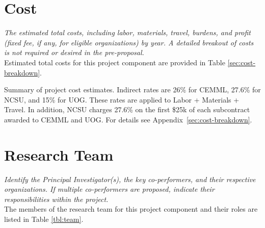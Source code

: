 \documentclass[11pt,english,letterpaper]{scrartcl}
\begin{document}
\begin{comment}
Month 2: Use annotations to train an object detector for CRB damage using the Faster R-CNN model implemented in the TensorFlow object detection API. This work requires setting up a virtual machine with graphics processing unit (GPU).

Month 3: Evaluate results from the trained object detector. If precision is insufficient, collect more annotated videos and add these to the training set.

Month 4: Develop a software system which will take raw video GPS tracks as input, outputting CRB damage maps and statistics.

Month 12: Prepare final report.

\end{comment}

\section{Cost}

\textit{The estimated total costs, including labor, materials, travel, burdens, and profit	(fixed fee, if any, for eligible organizations) by year. A detailed breakout of costs is not	required or desired in the pre-proposal.}\\

Estimated total costs for this project component are provided in Table \ref{sec:cost-breakdown}.

\begin{table}[h]
	\centering
	\caption{Summary of project cost estimates.
		Indirect rates are 26\% for CEMML, 27.6\% for NCSU, and 15\% for UOG.
		These rates are applied to Labor + Materials + Travel.
		In addition, NCSU charges 27.6\% on the first \$25k of each subcontract awarded to CEMML and UOG. For details see Appendix~\ref{sec:cost-breakdown}.}	
	
	\label{tbl:cost}
\end{table}

\section{Research Team}

\textit{Identify the Principal Investigator(s), the key co-performers, and their respective organizations. If multiple co-performers are proposed, indicate their responsibilities within the project.}\\

The members of the research team for this project component and their roles are listed in Table \ref{tbl:team}.
\end{document}
